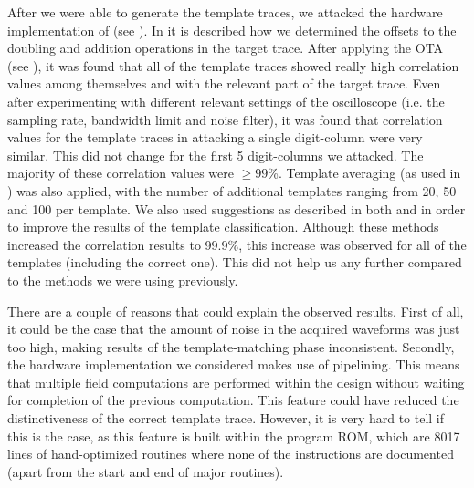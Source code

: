 After we were able to generate the template traces, we attacked the hardware implementation of {\fourq} (see ).
In  it is described how we determined the offsets to the doubling and addition operations in the target trace. 
After applying the OTA (see ), it was found that all of the template traces showed really high correlation values among themselves and with the relevant part of the target trace.
Even after experimenting with different relevant settings of the oscilloscope (i.e. the sampling rate, bandwidth limit and noise filter), it was found that correlation values for the template traces in attacking a single digit-column were very similar.
This did not change for the first 5 digit-columns we attacked.
The majority of these correlation values were $\ge99$\%.
Template averaging (as used in \cite{dugardin2016dismantling}) was also applied, with the number of additional templates ranging from 20, 50 and 100 per template. 
We also used suggestions as described in both  and  in order to improve the results of the template classification.
Although these methods increased the correlation results to 99.9\%, this increase was observed for all of the templates (including the correct one).
This did not help us any further compared to the methods we were using previously.

There are a couple of reasons that could explain the observed results.
First of all, it could be the case that the amount of noise in the acquired waveforms was just too high, making results of the template-matching phase inconsistent.
Secondly, the hardware implementation we considered makes use of pipelining.
This means that multiple field computations are performed within the design without waiting for completion of the previous computation.
This feature could have reduced the distinctiveness of the correct template trace.
However, it is very hard to tell if this is the case, as this feature is built within the program ROM, which are 8017 lines of hand-optimized routines where none of the instructions are documented (apart from the start and end of major routines).

